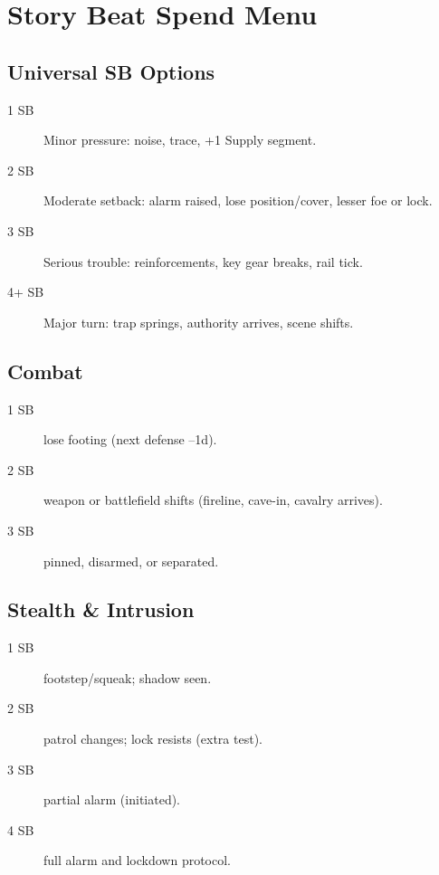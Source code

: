 \section{Story Beat Spend Menu}

\subsection{Universal SB Options}

\begin{description}
\item[1 SB] Minor pressure: noise, trace, +1 Supply segment.
\item[2 SB] Moderate setback: alarm raised, lose position/cover, lesser foe or lock.
\item[3 SB] Serious trouble: reinforcements, key gear breaks, rail tick.
\item[4+ SB] Major turn: trap springs, authority arrives, scene shifts.
\end{description}

\subsection{Combat}

\begin{description}
\item[1 SB] lose footing (next defense --1d).
\item[2 SB] weapon or battlefield shifts (fireline, cave-in, cavalry arrives).
\item[3 SB] pinned, disarmed, or separated.
\end{description}

\subsection{Stealth \& Intrusion}

\begin{description}
\item[1 SB] footstep/squeak; shadow seen.
\item[2 SB] patrol changes; lock resists (extra test).
\item[3 SB] partial alarm (initiated).
\item[4 SB] full alarm and lockdown protocol.
\end{description}

